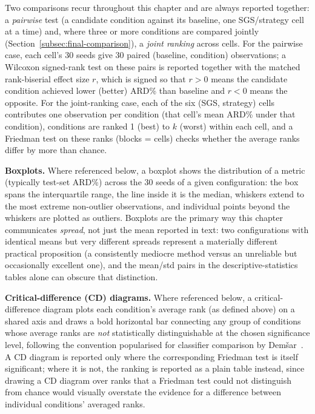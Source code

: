 Two comparisons recur throughout this chapter and are always reported
together: a \emph{pairwise} test (a candidate condition against its
baseline, one SGS/strategy cell at a time) and, where three or more
conditions are compared jointly (Section~\ref{subsec:final-comparison}), a
\emph{joint ranking} across cells. For the pairwise case, each cell's 30
seeds give 30 paired (baseline, condition) observations; a Wilcoxon
signed-rank test on these pairs is reported together with the matched
rank-biserial effect size $r$, which is signed so that $r>0$ means the
candidate condition achieved lower (better) ARD\% than baseline and $r<0$
means the opposite. For the joint-ranking case, each of the six (SGS,
strategy) cells contributes one observation per condition (that cell's mean
ARD\% under that condition), conditions are ranked 1 (best) to $k$ (worst)
within each cell, and a Friedman test on these ranks (blocks = cells)
checks whether the average ranks differ by more than chance.

\textbf{Boxplots.} Where referenced below, a boxplot shows the distribution
of a metric (typically test-set ARD\%) across the 30 seeds of a given
configuration: the box spans the interquartile range, the line inside it
is the median, whiskers extend to the most extreme non-outlier
observations, and individual points beyond the whiskers are plotted as
outliers. Boxplots are the primary way this chapter communicates
\emph{spread}, not just the mean reported in text: two configurations with
identical means but very different spreads represent a materially
different practical proposition (a consistently mediocre method versus an
unreliable but occasionally excellent one), and the mean/std pairs in the
descriptive-statistics tables alone can obscure that distinction.

\textbf{Critical-difference (CD) diagrams.} Where referenced below, a
critical-difference diagram plots each condition's average rank (as defined
above) on a shared axis and draws a bold horizontal bar connecting any
group of conditions whose average ranks are \emph{not} statistically
distinguishable at the chosen significance level, following the
convention popularised for classifier comparison by
Dem\v{s}ar~\cite{demsar2006}. A CD diagram
is reported only where the corresponding Friedman test is itself
significant; where it is not, the ranking is reported as a plain table
instead, since drawing a CD diagram over ranks that a Friedman test could
not distinguish from chance would visually overstate the evidence for a
difference between individual conditions' averaged ranks. 

